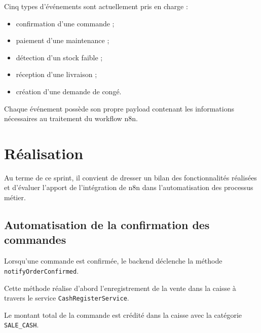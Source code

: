 Cinq types d'événements sont actuellement pris en charge :

\begin{itemize}
    \item confirmation d'une commande ;
    \item paiement d'une maintenance ;
    \item détection d'un stock faible ;
    \item réception d'une livraison ;
    \item création d'une demande de congé.
\end{itemize}

Chaque événement possède son propre payload contenant les informations nécessaires au traitement du workflow n8n.

%


\section{Réalisation}
Au terme de ce sprint, il convient de dresser un bilan des fonctionnalités réalisées et d'évaluer l'apport de l'intégration de n8n dans l'automatisation des processus métier.
\subsection{Automatisation de la confirmation des commandes}

Lorsqu'une commande est confirmée, le backend déclenche la méthode
\texttt{notifyOrderConfirmed}. 

Cette méthode réalise d'abord l'enregistrement de la vente dans la caisse à
travers le service \texttt{CashRegisterService}.

Le montant total de la commande est crédité dans la caisse avec la catégorie
\texttt{SALE\_CASH}. 

